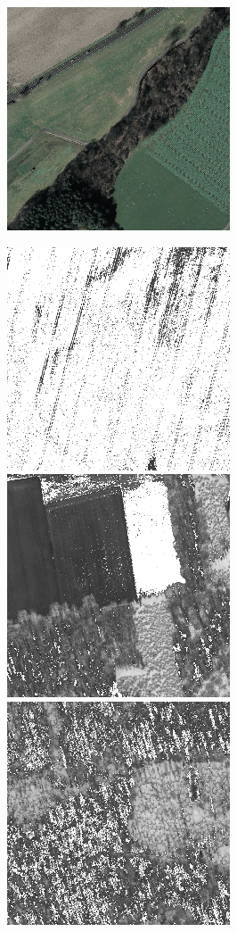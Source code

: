 \begin{figure}
    \includegraphics[width=\VegetationIndicesImageWidth]{images/vegetation/original/5}

    \vspace{3mm}
    \includegraphics[width=\VegetationIndicesImageWidth]{images/vegetation/ndvi/1} \hfill
    \includegraphics[width=\VegetationIndicesImageWidth]{images/vegetation/ndvi/2} \hfill
    \includegraphics[width=\VegetationIndicesImageWidth]{images/vegetation/ndvi/3} \hfill

\end{figure}
